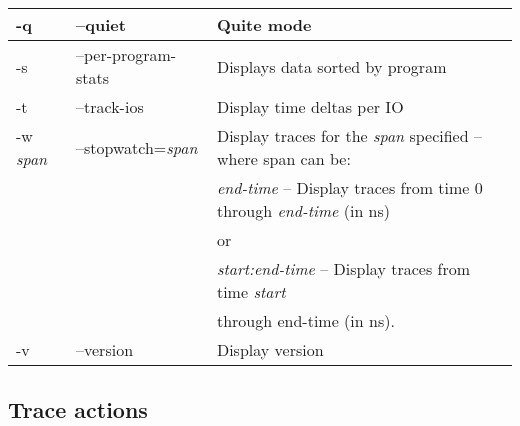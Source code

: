 \documentclass{article}
\begin{document}
\begin{tabular}{|l|l|l|}
-q                 & --quiet                    & Quite mode \\ \hline

-s                 & --per-program-stats        & Displays data sorted by program \\ \hline

-t                 & --track-ios                & Display time deltas per IO \\ \hline

-w \emph{span}     & --stopwatch=\emph{span}    & Display traces for the \emph{span} specified -- where span can be: \\ 
                   &                            & \emph{end-time} -- Display traces from time 0 through \emph{end-time} (in ns) \\
		   &                            & or \\
		   &                            & \emph{start:end-time} -- Display traces from time \emph{start} \\
		   &                            & through {end-time} (in ns). \\ \hline

-v                 & --version                  & Display version \\ \hline

\end{tabular}

\newpage
\subsection{\label{sec:blkparse-actions}Trace actions}
\end{document}
